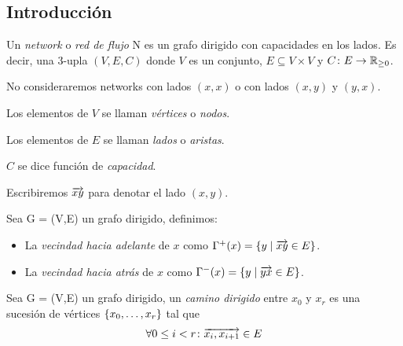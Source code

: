 \subsection{Introducción}

\begin{definition}
  Un \emph{network} o \emph{red de flujo}  N es un grafo dirigido con capacidades
  en los lados. Es decir, una $3$-upla $(V, E, C)$ donde $V$ es un conjunto,
  $E \subseteq V \times V$ y $C \colon E \to \mathbb{R}_{\ge 0}$.

  No consideraremos networks con lados $(x,x)$ o con lados $(x,y)$ y $(y,x)$.
\end{definition}

\begin{notation}

  Los elementos de $V$ se llaman \emph{vértices} o \emph{nodos}.

  Los elementos de $E$ se llaman \emph{lados} o \emph{aristas}.

  $C$ se dice función de \emph{capacidad}.

  Escribiremos $\overrightarrow{xy}$ para denotar el lado $(x,y)$.
\end{notation}

\begin{definition}
  Sea G = (V,E) un grafo dirigido, definimos:
  \begin{itemize}
  \item La \emph{vecindad hacia adelante} de $x$ como
    $\Gamma^{+}(x) = \{y\mid \overrightarrow{xy} \in E\}$.
  \item La \emph{vecindad hacia atrás} de $x$ como
    $\Gamma^{-}(x) = \{y\mid \overrightarrow{yx} \in E\}$.
  \end{itemize}
\end{definition}

\begin{definition}
  Sea G = (V,E) un grafo dirigido, un \emph{camino dirigido} entre $x_0$ y $x_r$
  es una sucesión de vértices $\{x_0,\mathellipsis, x_r\}$ tal que
  \begin{align}
    \forall 0 \le i < r \colon \overrightarrow{x_i,x_{i+1}} \in E \nonumber
  \end{align}
\end{definition}

